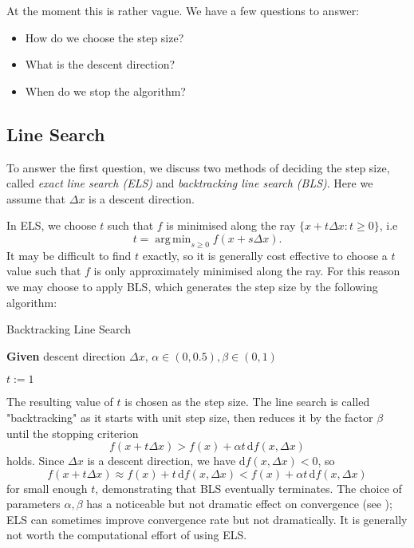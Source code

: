 \documentclass[a4paper,11pt]{article}
\DeclareMathOperator*{\argmin}{arg\,min}
\begin{document}
\newpage

At the moment this is rather vague. We have a few questions to answer:
\begin{itemize}
    \item How do we choose the step size?
    \item What is the descent direction?
    \item When do we stop the algorithm?
\end{itemize}



\subsection{Line Search}

To answer the first question, we discuss two methods of deciding the step size, called \textit{exact line search (ELS)} and \textit{backtracking line search (BLS)}. Here we assume that $\Delta x$ is a descent direction.

\vspace{3mm}

In ELS, we choose $t$ such that $f$ is minimised along the ray $\{x+t\Delta x:t\geqslant 0\}$, i.e $$t=\argmin_{s\geqslant 0} f(x+s\Delta x).$$ It may be difficult to find $t$ exactly, so it is generally cost effective to choose a $t$ value such that $f$ is only approximately minimised along the ray. For this reason we may choose to apply BLS, which generates the step size by the following algorithm:

\vspace{3mm}

\colorbox{blue!10}{\begin{algorithm}[H]\DontPrintSemicolon

\caption{Backtracking Line Search}
 
 \textbf{Given} descent direction $\Delta x$, $\alpha \in (0,0.5), \beta \in (0,1)$
 
 $t:=1$
 

\end{algorithm}}

\vspace{3mm}

The resulting value of $t$ is chosen as the step size. The line search is called "backtracking" as it starts with unit step size, then reduces it by the factor $\beta$ until the stopping criterion $$f(x+t\Delta x)>f(x)+\alpha t \,\text{d}f(x,\Delta x)$$ holds. Since $\Delta x$ is a descent direction, we have $\text{d}f(x,\Delta x)<0$, so $$f(x+t\Delta x) \approx f(x)+t\,\text{d}f(x,\Delta x) < f(x)+\alpha t\,\text{d}f(x,\Delta x) $$ for small enough $t$, demonstrating that BLS eventually terminates. The choice of parameters $\alpha,\beta$ has a noticeable but not dramatic effect on convergence (see \cite{convex}); ELS can sometimes improve convergence rate but not dramatically. It is generally not worth the computational effort of using ELS.
\end{document}
